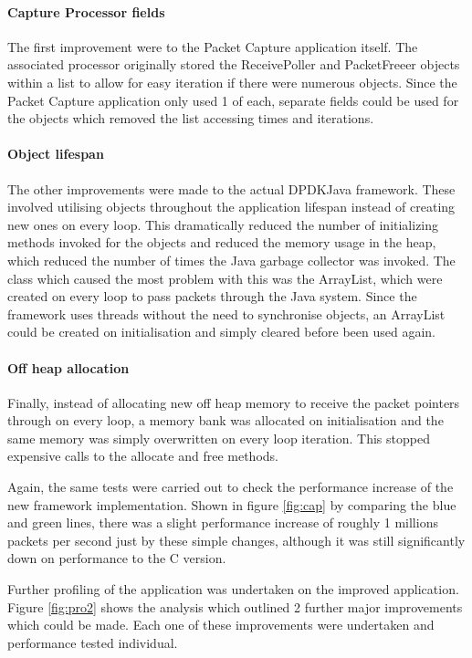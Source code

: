 \documentclass[final_report.tex]{subfiles}
\begin{document}
\paragraph*{Capture Processor fields}
The first improvement were to the Packet Capture application itself. The associated processor originally stored the ReceivePoller and PacketFreeer objects within a list to allow for easy iteration if there were numerous objects. Since the Packet Capture application only used 1 of each, separate fields could be used for the objects which removed the list accessing times and iterations.

\paragraph*{Object lifespan}
The other improvements were made to the actual DPDKJava framework. These involved utilising objects throughout the application lifespan instead of creating new ones on every loop. This dramatically reduced the number of initializing methods invoked for the objects and reduced the memory usage in the heap, which reduced the number of times the Java garbage collector was invoked. The class which caused the most problem with this was the ArrayList, which were created on every loop to pass packets through the Java system. Since the framework uses threads without the need to synchronise objects, an ArrayList could be created on initialisation and simply cleared before been used again.

\paragraph*{Off heap allocation}
Finally, instead of allocating new off heap memory to receive the packet pointers through on every loop, a memory bank was allocated on initialisation and the same memory was simply overwritten on every loop iteration. This stopped expensive calls to the allocate and free methods.

Again, the same tests were carried out to check the performance increase of the new framework implementation. Shown in figure \ref{fig:cap} by comparing the blue and green lines, there was a slight performance increase of roughly 1 millions packets per second just by these simple changes, although it was still significantly down on performance to the C version.

Further profiling of the application was undertaken on the improved application. Figure \ref{fig:pro2} shows the analysis which outlined 2 further major improvements which could be made. Each one of these improvements were undertaken and performance tested individual.
\end{document}
